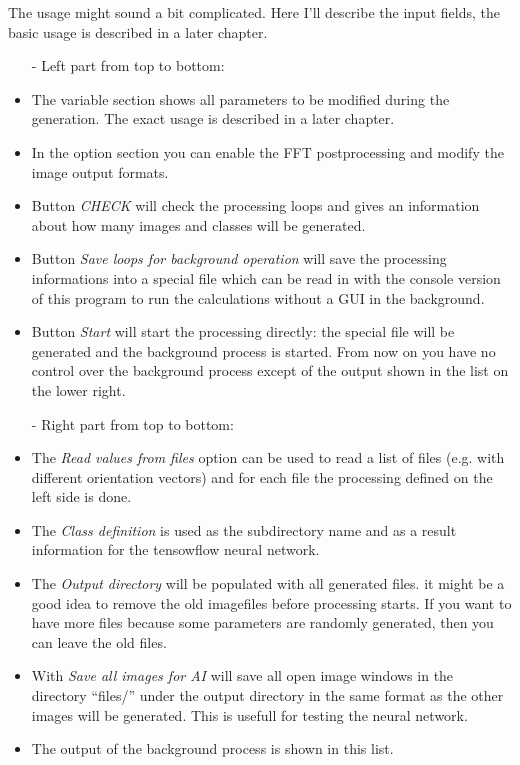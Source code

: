 \documentclass[11pt]{article} %
\begin{document}
The usage might sound a bit complicated. Here I'll describe the input fields, the basic usage is described in a later chapter.
\begin{itemize}\itemsep0pt
\item[-] Left part from top to bottom:
\item The variable section shows all parameters to be modified during the generation. The exact usage is described in a later chapter.
\item In the option section you can enable the FFT postprocessing and modify the image output formats.
\item Button {\it CHECK} will check the processing loops and gives an information about how many images and classes will be generated.
\item Button {\it Save loops for background operation} will save the processing informations into a special file which can be read in with the console version of this program to run the calculations without a GUI in the background.
\item Button {\it Start} will start the processing directly: the special file will be generated and the background process is started. From now on you have no control over the background process except of the output shown in the list on the lower right.
\item[-] Right part from top to bottom:
\item The {\it Read values from files} option can be used to read a list of files (e.g. with different orientation vectors) and for each file the processing defined on the left side is done.
\item The {\it Class definition} is used as the subdirectory name and as a result information for the tensowflow neural network.
\item The {\it Output directory} will be populated with all generated files. it might be a good idea to remove the old imagefiles before processing starts. If you want to have more files because some parameters are randomly generated, then you can leave the old files.
\item With {\it Save all images for AI} will save all open image windows in the directory ``files/'' under the output directory in the same format as the other images will be generated. This is usefull for testing the neural network.
\item The output of the background process is shown in this list.
\end{itemize}
\end{document}
